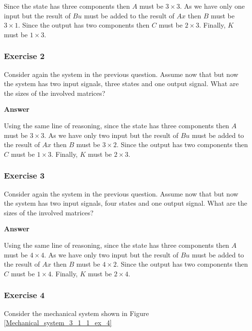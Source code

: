 Since the state has three components then $A$ must be $3\times 3$. As we have only one input but the result of $Bu$ must be added to the result of $Ax$ then $B$ must be $3\times 1$.
Since the output has two components then $C$ must be $2\times 3$. Finally, $K$ must be $1\times 3$.

\subsubsection{Exercise 2}

Consider again the system in the previous  question. Assume now that but now the system has two input signals, three states and one output signal. What are the sizes of the involved matrices?

\textbf{Answer}

Using the same line of reasoning, since the state has three components then $A$ must be $3\times 3$. As we have only two input but the result of $Bu$ must be added to the result of $Ax$ then $B$ must be $3\times 2$. Since the output has two components then $C$ must be $1\times 3$. Finally, $K$ must be $2\times 3$.

\subsubsection{Exercise 3}

Consider again the system in the previous  question. Assume now that but now the system has two input signals, four states and one output signal. What are the sizes of the involved matrices?

\textbf{Answer}

Using the same line of reasoning, since the state has three components then $A$ must be $4\times 4$. As we have only two input but the result of $Bu$ must be added to the result of $Ax$ then $B$ must be $4\times 2$. Since the output has two components then $C$ must be $1\times 4$. Finally, $K$ must be $2\times 4$.

\subsubsection{Exercise 4}

Consider the mechanical system shown in Figure \ref{Mechanical_system_3_1_1_ex_4} 

